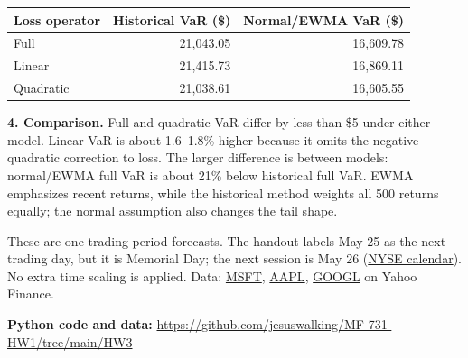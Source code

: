 \documentclass[10pt,letterpaper]{article}
\begin{document}
\begin{center}
\begin{tabular}{lrr}\toprule
Loss operator & Historical VaR (\$) & Normal/EWMA VaR (\$)\\\midrule
Full & 21,043.05 & 16,609.78\\
Linear & 21,415.73 & 16,869.11\\
Quadratic & 21,038.61 & 16,605.55\\\bottomrule
\end{tabular}
\end{center}

\textbf{4. Comparison.} Full and quadratic VaR differ by less than \$5
under either model. Linear VaR is about 1.6--1.8\% higher because it omits
the negative quadratic correction to loss. The larger difference is between
models: normal/EWMA full VaR is about 21\% below historical full VaR.
EWMA emphasizes recent returns, while the historical method weights all
500 returns equally; the normal assumption also changes the tail shape.

{\small These are one-trading-period forecasts. The handout labels May 25
as the next trading day, but it is Memorial Day; the next session is May 26
(\href{https://www.nyse.com/markets/hours-calendars}{NYSE calendar}). No extra
time scaling is applied. Data: \href{https://finance.yahoo.com/quote/MSFT/history/}{MSFT},
\href{https://finance.yahoo.com/quote/AAPL/history/}{AAPL},
\href{https://finance.yahoo.com/quote/GOOGL/history/}{GOOGL} on Yahoo Finance.}

\textbf{Python code and data:}
\url{https://github.com/jesuswalking/MF-731-HW1/tree/main/HW3}
\end{document}
